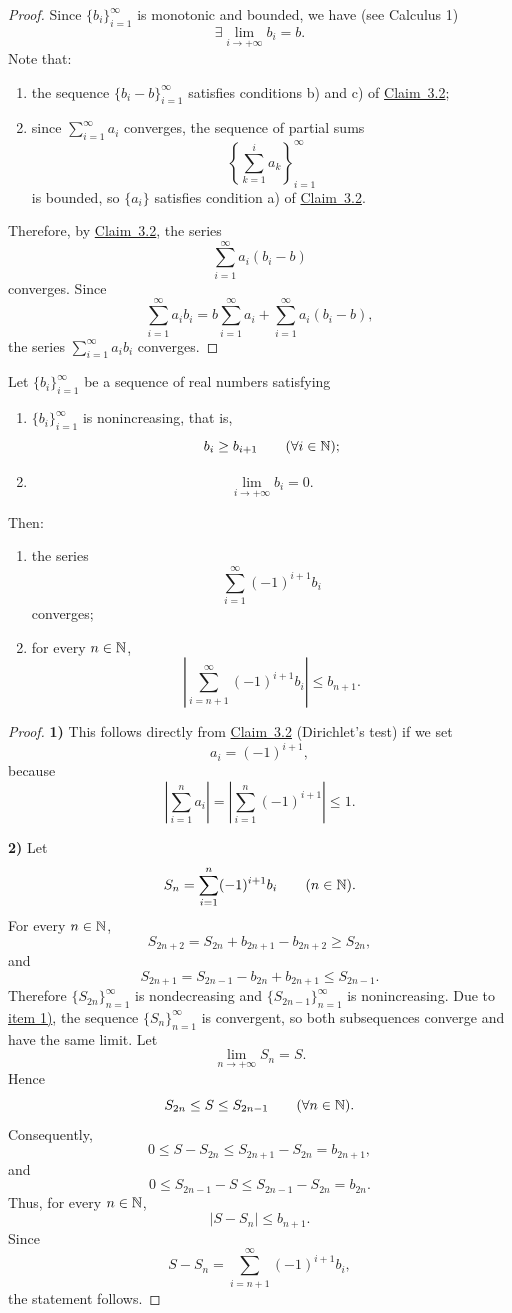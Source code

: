 \begin{proof}
Since $\{b_i\}_{i=1}^{\infty}$ is monotonic and bounded, we have (see Calculus 1)
\[
\exists\lim_{i\to+\infty}b_i=b.
\]
Note that:
\begin{enumerate}[label=\arabic*)]
\item the sequence $\{b_i-b\}_{i=1}^{\infty}$ satisfies conditions b) and c) of \hyperref[claim:3.2]{Claim~3.2};
\item since $\sum_{i=1}^{\infty}a_i$ converges, the sequence of partial sums
\[
\left\{\sum_{k=1}^{i}a_k\right\}_{i=1}^{\infty}
\]
is bounded, so $\{a_i\}$ satisfies condition a) of \hyperref[claim:3.2]{Claim~3.2}.
\end{enumerate}
Therefore, by \hyperref[claim:3.2]{Claim~3.2}, the series
\[
\sum_{i=1}^{\infty}a_i(b_i-b)
\]
converges. Since
\[
\sum_{i=1}^{\infty}a_i b_i
=b\sum_{i=1}^{\infty}a_i
+\sum_{i=1}^{\infty}a_i(b_i-b),
\]
the series $\sum_{i=1}^{\infty}a_i b_i$ converges.
\end{proof}

\begin{claim}\label{claim:3.4}
Let $\{b_i\}_{i=1}^{\infty}$ be a sequence of real numbers satisfying
\begin{enumerate}[label=\alph*)]
\item\label{item:claim:3.4:a} $\{b_i\}_{i=1}^{\infty}$ is nonincreasing, that is,
\[
b_i\ge b_{i+1}\qquad(\forall i\in\mathbb{N});
\]
\item\label{item:claim:3.4:b}
\[
\lim_{i\to+\infty}b_i=0.
\]
\end{enumerate}
Then:
\begin{enumerate}[label=\arabic*)]
\item\label{item:claim:3.4:1} the series
\[
\sum_{i=1}^{\infty}(-1)^{i+1}b_i
\]
converges;
\item\label{item:claim:3.4:2} for every $n\in\mathbb{N}$,
\[
\left|\sum_{i=n+1}^{\infty}(-1)^{i+1}b_i\right|\le b_{n+1}.
\]
\end{enumerate}
\end{claim}

\begin{proof}
\textbf{1)} This follows directly from \hyperref[claim:3.2]{Claim~3.2} (Dirichlet's test) if we set
\[
a_i=(-1)^{i+1},
\]
because
\[
\left|\sum_{i=1}^{n}a_i\right|
=\left|\sum_{i=1}^{n}(-1)^{i+1}\right|\le1.
\]

\medskip
\noindent\textbf{2)} Let
\[
S_n=\sum_{i=1}^{n}(-1)^{i+1}b_i
\qquad(n\in\mathbb{N}).
\]
For every $n\in\mathbb{N}$,
\[
S_{2n+2}=S_{2n}+b_{2n+1}-b_{2n+2}\ge S_{2n},
\]
and
\[
S_{2n+1}=S_{2n-1}-b_{2n}+b_{2n+1}\le S_{2n-1}.
\]
Therefore $\{S_{2n}\}_{n=1}^{\infty}$ is nondecreasing and $\{S_{2n-1}\}_{n=1}^{\infty}$ is nonincreasing. Due to \hyperref[item:claim:3.4:1]{item 1)}, the sequence $\{S_n\}_{n=1}^{\infty}$ is convergent, so both subsequences converge and have the same limit. Let
\[
\lim_{n\to+\infty}S_n=S.
\]
Hence
\[
S_{2n}\le S\le S_{2n-1}
\qquad(\forall n\in\mathbb{N}).
\]
Consequently,
\[
0\le S-S_{2n}\le S_{2n+1}-S_{2n}=b_{2n+1},
\]
and
\[
0\le S_{2n-1}-S\le S_{2n-1}-S_{2n}=b_{2n}.
\]
Thus, for every $n\in\mathbb{N}$,
\[
|S-S_n|\le b_{n+1}.
\]
Since
\[
S-S_n=\sum_{i=n+1}^{\infty}(-1)^{i+1}b_i,
\]
the statement follows.
\end{proof}

